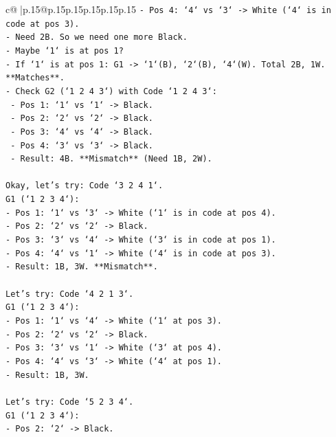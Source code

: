 \documentclass{article}
\begin{document}
{\begin{supertabular}{c@{$\;$}|p{.15\linewidth}@{}p{.15\linewidth}p{.15\linewidth}p{.15\linewidth}p{.15\linewidth}p{.15\linewidth}}
{{{\texttt{{-} Pos 4: `4` vs `3` {-}> White (`4` is in code at pos 3).} \\
\texttt{{-} Need 2B. So we need one more Black.} \\
\texttt{{-} Maybe `1` is at pos 1?} \\
\texttt{{-} If `1` is at pos 1: G1 {-}> `1`(B), `2`(B), `4`(W). Total 2B, 1W. **Matches**.} \\
\texttt{{-} Check G2 (`1 2 4 3`) with Code `1 2 4 3`:} \\
\texttt{    {-} Pos 1: `1` vs `1` {-}> Black.} \\
\texttt{    {-} Pos 2: `2` vs `2` {-}> Black.} \\
\texttt{    {-} Pos 3: `4` vs `4` {-}> Black.} \\
\texttt{    {-} Pos 4: `3` vs `3` {-}> Black.} \\
\texttt{    {-} Result: 4B. **Mismatch** (Need 1B, 2W).} \\
\\ 
\texttt{Okay, let's try: Code `3 2 4 1`.} \\
\texttt{G1 (`1 2 3 4`):} \\
\texttt{{-} Pos 1: `1` vs `3` {-}> White (`1` is in code at pos 4).} \\
\texttt{{-} Pos 2: `2` vs `2` {-}> Black.} \\
\texttt{{-} Pos 3: `3` vs `4` {-}> White (`3` is in code at pos 1).} \\
\texttt{{-} Pos 4: `4` vs `1` {-}> White (`4` is in code at pos 3).} \\
\texttt{{-} Result: 1B, 3W. **Mismatch**.} \\
\\ 
\texttt{Let's try: Code `4 2 1 3`.} \\
\texttt{G1 (`1 2 3 4`):} \\
\texttt{{-} Pos 1: `1` vs `4` {-}> White (`1` at pos 3).} \\
\texttt{{-} Pos 2: `2` vs `2` {-}> Black.} \\
\texttt{{-} Pos 3: `3` vs `1` {-}> White (`3` at pos 4).} \\
\texttt{{-} Pos 4: `4` vs `3` {-}> White (`4` at pos 1).} \\
\texttt{{-} Result: 1B, 3W.} \\
\\ 
\texttt{Let's try: Code `5 2 3 4`.} \\
\texttt{G1 (`1 2 3 4`):} \\
\texttt{{-} Pos 2: `2` {-}> Black.} \\
}}}
\end{supertabular}}
\end{document}
